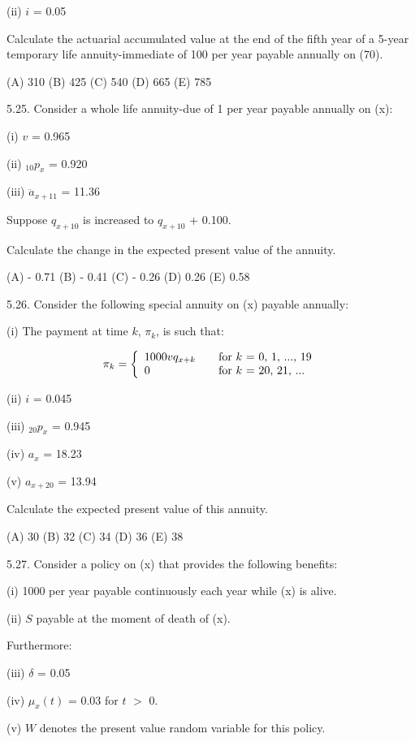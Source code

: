 \documentclass[]{book}
\begin{document}
(ii) \(i\) = 0.05

Calculate the actuarial accumulated value at the end of the fifth year
of a 5-year temporary life annuity-immediate of 100 per year payable
annually on (70).

(A) 310 (B) 425 (C) 540 (D) 665 (E) 785

5.25. Consider a whole life annuity-due of 1 per year payable annually
on (x):

(i) \(v\) = 0.965

(ii) \({}_{10}p_x\) = 0.920

(iii) \(\ddot{a}_{x + 11}\) = 11.36

Suppose \(q_{x + 10}\) is increased to \(q_{x + 10}\) + 0.100.

Calculate the change in the expected present value of the annuity.

(A) - 0.71 (B) - 0.41 (C) - 0.26 (D) 0.26 (E) 0.58

5.26. Consider the following special annuity on (x) payable annually:

(i) The payment at time \(k\), \(\pi_k\), is such that:

\[\pi_k = \left\{
  \begin{array}{l l}
    1000vq_{x + k} & \quad \text{for $k$ = 0, 1, ..., 19}\\
    0             & \quad \text{for $k$ = 20, 21, ...}\\
  \end{array} \right.\]

(ii) \(i\) = 0.045

(iii) \({}_{20}p_x\) = 0.945

(iv) \(a_x\) = 18.23

(v) \(a_{x + 20}\) = 13.94

Calculate the expected present value of this annuity.

(A) 30 (B) 32 (C) 34 (D) 36 (E) 38

5.27. Consider a policy on (x) that provides the following benefits:

(i) 1000 per year payable continuously each year while (x) is alive.

(ii) \(S\) payable at the moment of death of (x).

Furthermore:

(iii) \(\delta\) = 0.05

(iv) \(\mu_x(t)\) = 0.03 for \(t\) \(>\) 0.

(v) \(W\) denotes the present value random variable for this policy.
\end{document}
